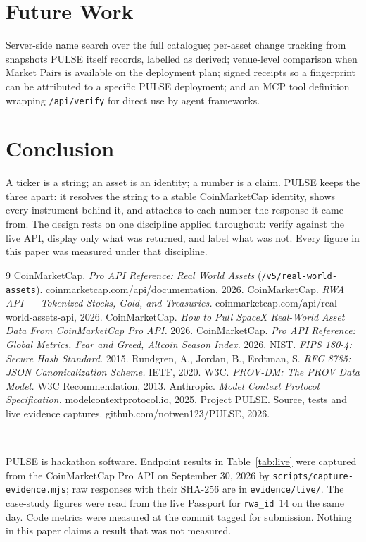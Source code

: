 \documentclass[11pt]{article}
\newcommand{\code}[1]{\texttt{\small #1}}
\begin{document}
\section{Future Work}
Server-side name search over the full catalogue; per-asset change tracking from snapshots \textsc{PULSE} itself records, labelled as derived; venue-level comparison when Market Pairs is available on the deployment plan; signed receipts so a fingerprint can be attributed to a specific \textsc{PULSE} deployment; and an MCP tool definition wrapping \code{/api/verify} for direct use by agent frameworks.

\section{Conclusion}
A ticker is a string; an asset is an identity; a number is a claim. \textsc{PULSE} keeps the three apart: it resolves the string to a stable CoinMarketCap identity, shows every instrument behind it, and attaches to each number the response it came from. The design rests on one discipline applied throughout: verify against the live API, display only what was returned, and label what was not. Every figure in this paper was measured under that discipline.

\begin{thebibliography}{9}\small
{} CoinMarketCap. \emph{Pro API Reference: Real World Assets} (\code{/v5/real-world-assets}). coinmarketcap.com/api/documentation, 2026.
 CoinMarketCap. \emph{RWA API --- Tokenized Stocks, Gold, and Treasuries.} coinmarketcap.com/api/real-world-assets-api, 2026.
 CoinMarketCap. \emph{How to Pull SpaceX Real-World Asset Data From CoinMarketCap Pro API.} 2026.
 CoinMarketCap. \emph{Pro API Reference: Global Metrics, Fear and Greed, Altcoin Season Index.} 2026.
 NIST. \emph{FIPS 180-4: Secure Hash Standard.} 2015.
 Rundgren, A., Jordan, B., Erdtman, S. \emph{RFC 8785: JSON Canonicalization Scheme.} IETF, 2020.
 W3C. \emph{PROV-DM: The PROV Data Model.} W3C Recommendation, 2013.
 Anthropic. \emph{Model Context Protocol Specification.} modelcontextprotocol.io, 2025.
 Project PULSE. Source, tests and live evidence captures. github.com/notwen123/PULSE, 2026.
\end{thebibliography}

\vspace{6pt}
\noindent\rule{\linewidth}{0.4pt}\\
{\footnotesize \textsc{PULSE} is hackathon software. Endpoint results in Table~\ref{tab:live} were captured from the CoinMarketCap Pro API on September 30, 2026 by \code{scripts/capture-evidence.mjs}; raw responses with their SHA-256 are in \code{evidence/live/}. The case-study figures were read from the live Passport for \code{rwa\_id}~14 on the same day. Code metrics were measured at the commit tagged for submission. Nothing in this paper claims a result that was not measured.}
\end{document}
